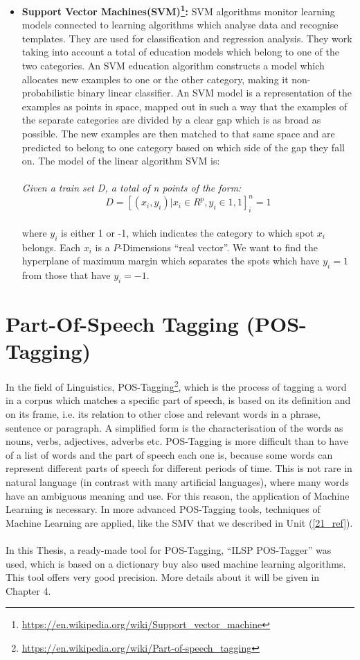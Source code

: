 \begin{itemize}
	\item \textbf{Support Vector Machines(SVM)\footnote{\url{https://en.wikipedia.org/wiki/Support_vector_machine}}:} SVM algorithms monitor learning models connected to learning algorithms which analyse data and recognise templates. They are used for classification and regression analysis. They work taking into account a total of education models which belong to one of the two categories. An SVM education algorithm constructs a model which allocates new examples to one or the other category, making it non-probabilistic binary linear classifier. An SVM model is a representation of the examples as points in space, mapped out in such a way that the examples of the separate categories are divided by a clear gap which is as broad as possible. The new examples are then matched to that same space and are predicted to belong to one category based on which side of the gap they fall on. The model of the linear algorithm  SVM is:\\
\\
\textit{Given a train set D, a total of n points of the form:}
\\
\begin{equation}
D=\left[(x_{i},y_{i})|x_{i}\in R^{p},y_{i}\in{1,1}\right]_{i}^{n}=1
\end{equation}
\\
where $y_{i}$ is either 1 or -1, which indicates the category to which spot $x_{i}$ belongs. Each $x_{i}$ is a $P$-Dimensions ``real vector''. We want to find the hyperplane of maximum margin which separates the spots which have $y_{i}=1$ from those that have $y_{i}=-1$.

\end{itemize}
\section{Part-Of-Speech Tagging (POS-Tagging)}\label{22_ref}
In the field of Linguistics, POS-Tagging\footnote{\url{https://en.wikipedia.org/wiki/Part-of-speech_tagging}}, which is the process of tagging a word in a corpus which matches a specific part of speech, is based  on its definition and on its frame, i.e. its relation to other close and relevant words in a phrase, sentence or paragraph. A simplified form is the characterisation of the words as nouns, verbs, adjectives, adverbs etc. POS-Tagging is more difficult than to have of a list of words and the part of speech each one is, because some words can represent different parts of speech for different periods of time. This is not rare in natural language (in contrast with many artificial languages), where many words have an ambiguous meaning and use. For this reason, the application of Machine Learning is necessary. In more advanced POS-Tagging tools, techniques of Machine Learning are applied, like the SMV that we described in Unit (\ref{21_ref}).\\
\\
In this Thesis, a ready-made tool for POS-Tagging, ``ILSP POS-Tagger'' was used, which is based on a dictionary buy also used machine learning algorithms. This tool offers very good precision. More details about it will be given in Chapter 4.

